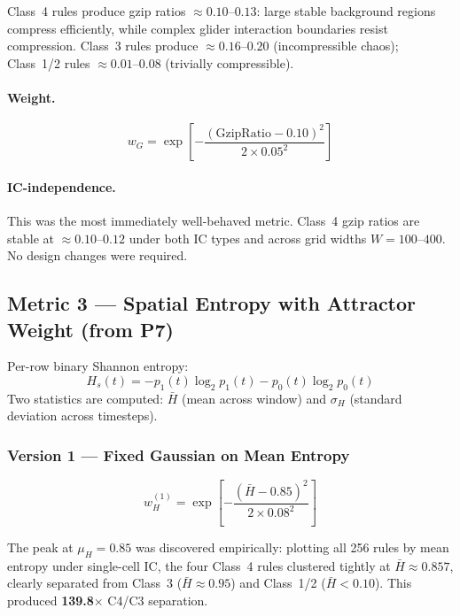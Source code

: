 \documentclass[12pt,a4paper]{article}
\begin{document}
Class~4 rules produce gzip ratios $\approx 0.10$--$0.13$: large stable
background regions compress efficiently, while complex glider interaction
boundaries resist compression.
Class~3 rules produce $\approx 0.16$--$0.20$ (incompressible chaos);
Class~1/2 rules $\approx 0.01$--$0.08$ (trivially compressible).

\paragraph{Weight.}
\begin{equation}
w_G = \exp\!\left[-\frac{(\text{GzipRatio} - 0.10)^2}{2 \times 0.05^2}\right]
\end{equation}

\paragraph{IC-independence.}
This was the most immediately well-behaved metric.
Class~4 gzip ratios are stable at $\approx 0.10$--$0.12$ under both IC types
and across grid widths $W = 100$--$400$.
No design changes were required.

\subsection{Metric 3 --- Spatial Entropy with Attractor Weight (from P7)}

Per-row binary Shannon entropy:
\begin{equation}
H_s(t) = -p_1(t)\log_2 p_1(t) - p_0(t)\log_2 p_0(t)
\end{equation}
Two statistics are computed: $\bar{H}$ (mean across window) and $\sigma_H$
(standard deviation across timesteps).

\subsubsection*{Version 1 --- Fixed Gaussian on Mean Entropy}

\begin{equation}
w_H^{(1)} = \exp\!\left[-\frac{(\bar{H} - 0.85)^2}{2 \times 0.08^2}\right]
\end{equation}

The peak at $\mu_H = 0.85$ was discovered empirically: plotting all 256 rules
by mean entropy under single-cell IC, the four Class~4 rules clustered tightly
at $\bar{H} \approx 0.857$, clearly separated from Class~3 ($\bar{H} \approx 0.95$)
and Class~1/2 ($\bar{H} < 0.10$).
This produced \textbf{139.8$\times$} C4/C3 separation.
\end{document}
